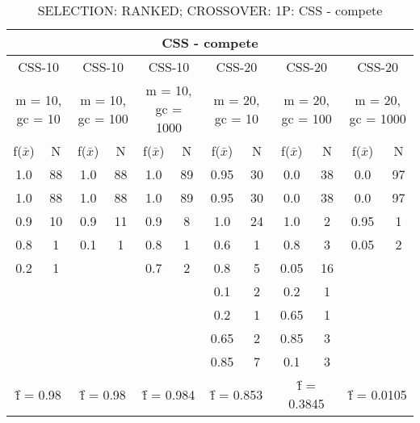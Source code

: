 \begin{table}[H]
	\centering
	\caption{SELECTION: RANKED; CROSSOVER: 1P: CSS - compete}
	\begin{adjustbox}{width=1\textwidth}
		\begin{tabular}{ |c|c||c|c||c|c||c|c||c|c||c|c| }
			\hline
			\multicolumn{12}{|c|}{CSS - compete} \\
			\hline
			\multicolumn{2}{|c||}{CSS-10} & \multicolumn{2}{c||}{CSS-10} & \multicolumn{2}{c||}{CSS-10} & \multicolumn{2}{c||}{CSS-20} & \multicolumn{2}{c||}{CSS-20} & \multicolumn{2}{c|}{CSS-20}\\
			\hline
			\multicolumn{2}{|c||}{m = 10, gc = 10} & \multicolumn{2}{c||}{m = 10, gc = 100} & \multicolumn{2}{c||}{m = 10, gc = 1000} & \multicolumn{2}{c||}{m = 20, gc = 10} & \multicolumn{2}{c||}{m = 20, gc = 100} & \multicolumn{2}{c|}{m = 20, gc = 1000}\\
			\hline
			f($\bar{x}$) & N & f($\bar{x}$) & N & f($\bar{x}$) & N & f($\bar{x}$) & N & f($\bar{x}$) & N & f($\bar{x}$) & N\\
			\hline
			\hline
			1.0 & 88 & 1.0 & 88 & 1.0 & 89 & 0.95 & 30 & 0.0 & 38 & 0.0 & 97\\
			\hline
			1.0 & 88 & 1.0 & 88 & 1.0 & 89 & 0.95 & 30 & 0.0 & 38 & 0.0 & 97\\
			0.9 & 10 & 0.9 & 11 & 0.9 & 8 & 1.0 & 24 & 1.0 & 2 & 0.95 & 1\\
			0.8 & 1 & 0.1 & 1 & 0.8 & 1 & 0.6 & 1 & 0.8 & 3 & 0.05 & 2\\
			0.2 & 1 &   &   & 0.7 & 2 & 0.8 & 5 & 0.05 & 16 &   &  \\
			&   &   &   &   &   & 0.1 & 2 & 0.2 & 1 &   &  \\
			&   &   &   &   &   & 0.2 & 1 & 0.65 & 1 &   &  \\
			&   &   &   &   &   & 0.65 & 2 & 0.85 & 3 &   &  \\
			&   &   &   &   &   & 0.85 & 7 & 0.1 & 3 &   &  \\
			\hline
			\multicolumn{2}{|c||}{\^{f} = 0.98} & \multicolumn{2}{c||}{\^{f} = 0.98} & \multicolumn{2}{c||}{\^{f} = 0.984} & \multicolumn{2}{c||}{\^{f} = 0.853} & \multicolumn{2}{c||}{\^{f} = 0.3845} & \multicolumn{2}{c|}{\^{f} = 0.0105}\\
			\hline
		\end{tabular}
	\end{adjustbox}
\end{table}

